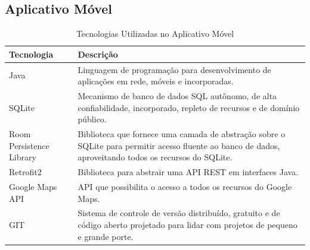 {{{{{{\addtocounter{footnote}{-7}

\subsection*{Aplicativo Móvel}

{\renewcommand{\arraystretch}{2}
\begin{table}[H]
\centering
\caption{Tecnologias Utilizadas no Aplicativo Móvel}
\label{tab:tecnologias-utilizadas-movel}
\begin{tabular}{ l | p{11cm} }
\hline
\textbf{Tecnologia} & \textbf{Descrição} \\
\hline
Java\footnotemark & Linguagem de programação para desenvolvimento de aplicações em rede, móveis e incorporadas. \\ \hline
SQLite\footnotemark & Mecanismo de banco de dados SQL autônomo, de alta confiabilidade, incorporado, repleto de recursos e de domínio público. \\ \hline
Room Persistence Library\footnotemark & Biblioteca que fornece uma camada de abstração sobre o SQLite para permitir acesso fluente ao banco de dados, aproveitando todos os recursos do SQLite. \\ \hline
Retrofit2\footnotemark & Biblioteca para abstrair uma API REST em interfaces Java. \\ \hline
Google Maps API\footnotemark & API que possibilita o acesso a todos os recursos do Google Maps. \\ \hline
GIT & Sistema de controle de versão distribuído, gratuito e de código aberto projetado para lidar com projetos de pequeno e grande porte. \\ \hline
\end{tabular}
\end{table}

\addtocounter{footnote}{-5}

}}}}}}}
